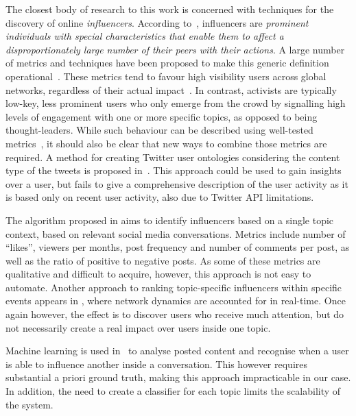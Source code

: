 The closest body of research to this work is concerned with techniques for the discovery of online \textit{influencers}. 
According to~\cite{Kardara2015}, influencers are \textit{prominent individuals with special characteristics that enable them to	affect a disproportionately large number of their peers with their actions}.
%
A large number of metrics and techniques have been proposed to make this generic definition operational~\cite{RIQUELME2016949}. 
%
These metrics tend to favour high visibility users across global networks, regardless of their actual impact~\cite{Cha2010MeasuringUI}. 
%
In contrast, activists are typically low-key, less prominent users who only emerge from the crowd by signalling high levels of engagement with one or more specific topics, as opposed to being thought-leaders. 
%
While such behaviour can be described  using well-tested metrics~\cite{RIQUELME2016949}, it should also be clear that new ways to combine those metrics are required.
A method for creating Twitter user ontologies considering the content type of the tweets is proposed in~\cite{6978961}. This approach could be used to gain insights over a user, but fails to give a comprehensive description of the user activity as it is based only on recent user activity, also due to Twitter API limitations.

The algorithm proposed in \cite{MATIC2011} aims to identify influencers based on a single topic context, based on relevant social media conversations.
Metrics include number of ``likes'', viewers per months, post frequency and  number of comments per post, as well as the ratio of positive to negative posts.
As some of these metrics are qualitative and difficult to acquire, however, this approach is not easy to automate.
%
Another approach to ranking topic-specific influencers within specific events appears in  \cite{Kardara2015}, where network dynamics are accounted for in real-time.
Once again however, the effect is to discover users who receive much attention, but do not necessarily create a real impact over users inside one topic.

Machine learning is used in~\cite{Biran2012} to analyse posted content and recognise when a user is able to influence another  inside a conversation.
This however requires substantial a priori ground truth, making this approach impracticable in our case. In addition, the need to create a classifier for each topic limits the scalability of the system.

